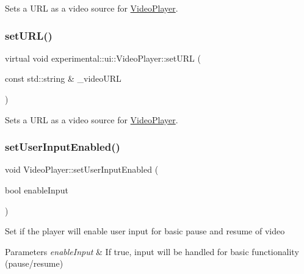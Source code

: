 Sets a U\+RL as a video source for \hyperlink{classexperimental_1_1ui_1_1VideoPlayer}{Video\+Player}. \mbox{\label{classexperimental_1_1ui_1_1VideoPlayer_a2491bab42a29abbb44710aecb730b566}} 
\subsubsection{\texorpdfstring{set\+U\+R\+L()}{setURL()}\hspace{0.1cm}{\footnotesize\ttfamily [2/2]}}
{\footnotesize\ttfamily virtual void experimental\+::ui\+::\+Video\+Player\+::set\+U\+RL (\begin{DoxyParamCaption}\item[{const std\+::string \&}]{\+\_\+video\+U\+RL }\end{DoxyParamCaption})\hspace{0.3cm}{\ttfamily [virtual]}}

Sets a U\+RL as a video source for \hyperlink{classexperimental_1_1ui_1_1VideoPlayer}{Video\+Player}. \mbox{\label{classexperimental_1_1ui_1_1VideoPlayer_a1adc885898d12a1aba789699ed0ed84e}} 
\subsubsection{\texorpdfstring{set\+User\+Input\+Enabled()}{setUserInputEnabled()}}
{\footnotesize\ttfamily void Video\+Player\+::set\+User\+Input\+Enabled (\begin{DoxyParamCaption}\item[{bool}]{enable\+Input }\end{DoxyParamCaption})\hspace{0.3cm}{\ttfamily [virtual]}}

Set if the player will enable user input for basic pause and resume of video


\begin{DoxyParams}{Parameters}
{\em enable\+Input} & If true, input will be handled for basic functionality (pause/resume) \\
\hline
\end{DoxyParams}
\mbox{\label{classexperimental_1_1ui_1_1VideoPlayer_af28796de69c4a67f627945fe070861bf}} 
